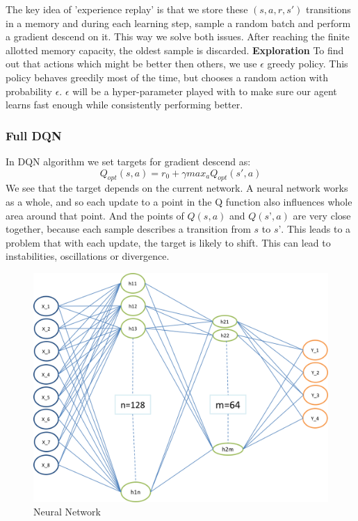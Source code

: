 The key idea of 'experience replay' is that we store these $(s, a, r, s')$ transitions in a memory and during each learning step, sample a random batch and perform a gradient descend on it. This way we solve both issues.
After reaching the finite allotted memory capacity, the oldest sample is discarded.
\newline \newline
\textbf{Exploration}
To find out that actions which might be better then others, we use $\epsilon$ greedy policy. This policy behaves greedily most of the time, but chooses a random action with probability $\epsilon$. $\epsilon$ will be a hyper-parameter played with to make sure our agent learns fast enough while consistently performing better.

\subsubsection{Full DQN}
In DQN algorithm we set targets for gradient descend as:
\begin{equation}
Q_{opt}(s,a) = r_{0} + \gamma max_{a}Q_{opt}(s',a)
\end{equation}
We see that the target depends on the current network. A neural network works as a whole, and so each update to a point in the Q function also influences whole area around that point. And the points of $Q(s, a)$ and $Q(s’, a)$ are very close together, because each sample describes a transition from $s$ to $s’$. This leads to a problem that with each update, the target is likely to shift. This can lead to instabilities, oscillations or divergence.
\newline
\begin{figure}[!ht]
\centering
\includegraphics[scale=0.75,width=0.75\columnwidth]{figures/NN.png}%
\caption{ Neural Network}%
\label{fig:Visualization}%
\end{figure}

